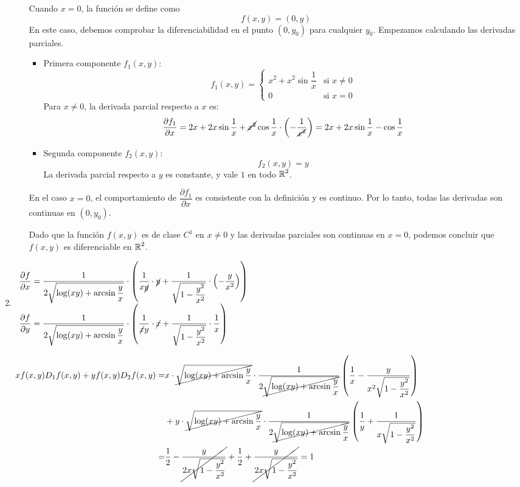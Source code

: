 \begin{enumerate}[label=\color{red}\textbf{\arabic*)}, leftmargin=*]
\begin{itemize}
Cuando $x=0$, la función se define como \[ f(x,y)=(0,y) \]En este caso, debemos comprobar la diferenciabilidad en el punto $(0,y_0)$ para cualquier $y_0$. Empezamos calculando las derivadas parciales.
\begin{itemize}[label=\textbullet]
	\item Primera componente $f_1(x,y)$: \[ f_1(x,y)=\begin{cases}
	x^{2}+x^{2}\sin\dfrac{1}{x} & \text{si }x\neq0\\
	0 & \text{si }x=0
	\end{cases} \] Para $x\neq0$, la derivada parcial respecto a $x$ es: \[ \dfrac{\partial f_1}{\partial x}=2x+2x\sin\dfrac{1}{x}+\cancel{x^{2}}\cos\dfrac{1}{x}\cdot\left(-\dfrac{1}{\cancel{x^{2}}}\right)=2x+2x\sin\dfrac{1}{x}-\cos\dfrac{1}{x} \]
	\item Segunda componente $f_2(x,y)$: \[ f_2(x,y)=y \] La derivada parcial respecto a $y$ es constante, y vale $1$ en todo $\operatorname{\mathbb{R}}^{2}$.
\end{itemize}
En el caso $x=0$, el comportamiento de $\dfrac{\partial f_1}{\partial x}$ es consistente con la definición y es continuo. Por lo tanto, todas las derivadas son continuas en $(0,y_0)$.

Dado que la función $f(x,y)$ es de clase $C^{1}$ en $x\neq0$ y las derivadas parciales son continuas en $x=0$, podemos concluir que $f(x,y)$ es diferenciable en $\operatorname{\mathbb{R}}^{2}$.
\end{itemize}

\item {}

$\begin{array}{l}
\dfrac{\partial f}{\partial x}=\dfrac{1}{2\sqrt{\log(xy)+\arcsin\dfrac{y}{x}}}\cdot\left(\dfrac{1}{x\cancel{y}}\cdot \cancel{y}+\dfrac{1}{\sqrt{1-\dfrac{y^{2}}{x^{2}}}}\cdot\left(-\dfrac{y}{x^{2}}\right)\right)\\
\dfrac{\partial f}{\partial y}=\dfrac{1}{2\sqrt{\log(xy)+\arcsin\dfrac{y}{x}}}\cdot\left(\dfrac{1}{\cancel{x}y}\cdot\cancel{x}+\dfrac{1}{\sqrt{1-\dfrac{y^{2}}{x^{2}}}}\cdot\dfrac{1}{x}\right)
\end{array}$

$\begin{aligned}
xf(x,y)D_1f(x,y)+yf(x,y)D_2f(x,y)=&x\cdot\cancel{\sqrt{\log(xy)+\arcsin\dfrac{y}{x}}}\cdot\dfrac{1}{2\cancel{\sqrt{\log(xy)+\arcsin\dfrac{y}{x}}}}\left(\dfrac{1}{x}-\dfrac{y}{x^{2}\sqrt{1-\dfrac{y^{2}}{x^{2}}}}\right)\\
&+y\cdot\cancel{\sqrt{\log(xy)+\arcsin\dfrac{y}{x}}}\cdot\dfrac{1}{2\cancel{\sqrt{\log(xy)+\arcsin\dfrac{y}{x}}}}\left(\dfrac{1}{y}+\dfrac{1}{x\sqrt{1-\dfrac{y^{2}}{x^{2}}}}\right)\\
=&\dfrac{1}{2}-\cancel{\dfrac{y}{2x\sqrt{1-\dfrac{y^{2}}{x^{2}}}}}+\dfrac{1}{2}+\cancel{\dfrac{y}{2x\sqrt{1-\dfrac{y^{2}}{x^{2}}}}}=1
\end{aligned}$


\end{enumerate}
